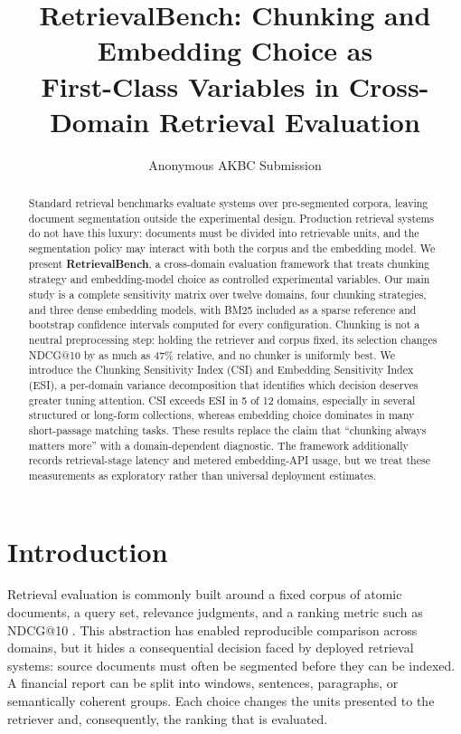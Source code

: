 \documentclass[10pt,letterpaper]{article}
\title{RetrievalBench: Chunking and Embedding Choice as\\
First-Class Variables in Cross-Domain Retrieval Evaluation}
\author{Anonymous AKBC Submission}
\date{}
\begin{document}
\maketitle

\begin{abstract}
Standard retrieval benchmarks evaluate systems over pre-segmented corpora, leaving document
segmentation outside the experimental design. Production retrieval systems do not have this
luxury: documents must be divided into retrievable units, and the segmentation policy may
interact with both the corpus and the embedding model. We present \textbf{RetrievalBench}, a
cross-domain evaluation framework that treats chunking strategy and embedding-model choice as
controlled experimental variables. Our main study is a complete sensitivity matrix over twelve
domains, four chunking strategies, and three dense embedding models, with BM25 included as a
sparse reference and bootstrap confidence intervals computed for every configuration. Chunking
is not a neutral preprocessing step: holding the retriever and corpus fixed, its selection changes
NDCG@10 by as much as 47\% relative, and no chunker is uniformly best. We introduce the
Chunking Sensitivity Index (CSI) and Embedding Sensitivity Index (ESI), a per-domain variance
decomposition that identifies which decision deserves greater tuning attention. CSI exceeds ESI
in 5 of 12 domains, especially in several structured or long-form collections, whereas embedding
choice dominates in many short-passage matching tasks. These results replace the claim that
``chunking always matters more'' with a domain-dependent diagnostic. The framework additionally
records retrieval-stage latency and metered embedding-API usage, but we treat these measurements
as exploratory rather than universal deployment estimates.
\end{abstract}

\section{Introduction}

Retrieval evaluation is commonly built around a fixed corpus of atomic documents, a query set,
relevance judgments, and a ranking metric such as NDCG@10 \cite{thakur2021beir}. This abstraction
has enabled reproducible comparison across domains, but it hides a consequential decision faced
by deployed retrieval systems: source documents must often be segmented before they can be
indexed. A financial report can be split into windows, sentences, paragraphs, or semantically
coherent groups. Each choice changes the units presented to the retriever and, consequently, the
ranking that is evaluated.
\end{document}
